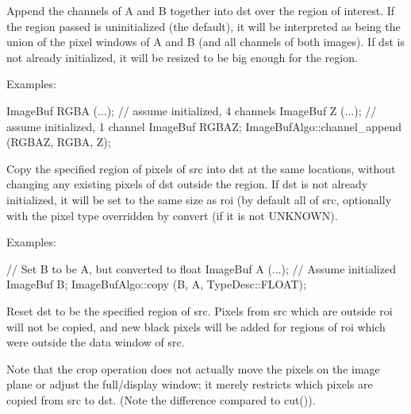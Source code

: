  
Append the channels of {\cf A} and {\cf B} together into {\cf dst} over
the region of interest.  If the region passed is uninitialized (the
default), it will be interpreted as being the union of the pixel windows
of {\cf A} and {\cf B} (and all channels of both images).  If {\cf dst}
is not already initialized, it will be resized to be big enough for the
region.

\smallskip
\noindent Examples:
\begin{code}
    ImageBuf RGBA (...);   // assume initialized, 4 channels
    ImageBuf Z (...);      // assume initialized, 1 channel
    ImageBuf RGBAZ;
    ImageBufAlgo::channel_append (RGBAZ, RGBA, Z);
\end{code}
\apiend


 
Copy the specified region of pixels of {\cf src} into {\cf dst} at the same
locations, without changing any existing pixels of {\cf dst} outside the
region.  If {\cf dst} is not already initialized, it will be set to the same
size as {\cf roi} (by default all of {\cf src}, optionally with the pixel
type overridden by {\cf convert} (if it is not {\cf UNKNOWN}).

\smallskip
\noindent Examples:
\begin{code}
    // Set B to be A, but converted to float
    ImageBuf A (...);  // Assume initialized
    ImageBuf B;
    ImageBufAlgo::copy (B, A, TypeDesc::FLOAT);
\end{code}
\apiend


 
Reset {\cf dst} to be the specified region of {\cf src}.
Pixels from {\cf src} which are outside {\cf roi} will not be copied, and
new black pixels will be added for regions of {\cf roi} which were outside
the data window of {\cf src}.

Note that the {\cf crop} operation does not actually move the pixels on the
image plane or adjust the full/display window; it merely restricts which
pixels are copied from {\cf src} to {\cf dst}.  (Note the difference
compared to {\cf cut()}).

